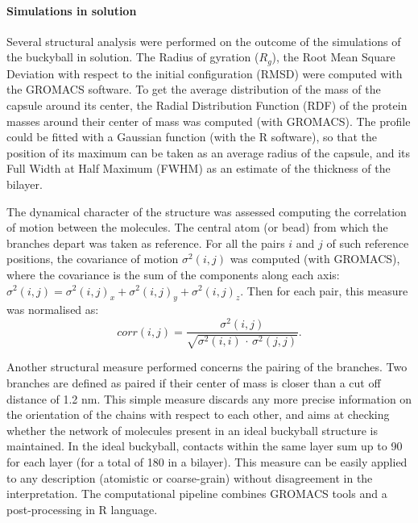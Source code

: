 \paragraph{Simulations in solution}
Several structural analysis were performed on the outcome of the simulations of the buckyball in solution. The Radius of gyration ($R_g$), the Root Mean Square Deviation with respect to the initial configuration (RMSD) were computed with the GROMACS software.
%
To get the average distribution of the mass of the capsule around its center, the Radial Distribution Function (RDF) of the protein masses around their center of mass was computed (with GROMACS). The profile could be fitted with a Gaussian function (with the R \cite{??} software), so that the position of its maximum can be taken as an average radius of the capsule, and its Full Width at Half Maximum (FWHM) as an estimate of the thickness of the bilayer.

The dynamical character of the structure was assessed computing the correlation of motion between the molecules. The central atom (or bead) from which the branches depart was taken as reference. For all the pairs $i$ and $j$ of such reference positions, the covariance of motion $\sigma^2(i,j)$ was computed (with GROMACS), where the covariance is the sum of the components along each axis: $\sigma^2(i,j) = \sigma^2(i,j)_x + \sigma^2(i,j)_y + \sigma^2(i,j)_z$. Then for each pair, this measure was normalised as:
\begin{equation}
corr(i,j) = \frac{\sigma^2(i,j)}{\sqrt{\sigma^2(i,i)\,\cdot\,\sigma^2(j,j)}}.
\end{equation}

Another structural measure performed concerns the pairing of the branches. Two branches are defined as paired if their center of mass is closer than a cut off distance of 1.2 nm. This simple measure discards any more precise information on the orientation of the chains with respect to each other, and aims at checking whether the network of molecules present in an ideal buckyball structure is maintained. In the ideal buckyball, contacts within the same layer sum up to 90 for each layer (for a total of 180 in a bilayer). This measure can be easily applied to any description (atomistic or coarse-grain) without disagreement in the interpretation. The computational pipeline combines GROMACS tools and a post-processing in R language.

